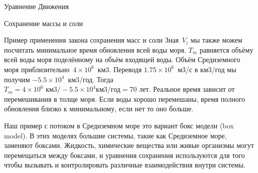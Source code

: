 \begin{chapter}{Уравнение Движения}
\begin{section}{Сохранение массы и соли}
\begin{paragraph}{Пример применения закона сохранения масс и соли}
Зная~$V_i$ мы также можем посчитать минимальное время обновления всей
воды моря. $T_m$ равняется объёму всей воды моря поделённому на объём
входящей воды. Объём Средиземного моря приблизительно~$4\times 10^6$~км3.  
Переводя $1.75\times 10^6$~м3/с в км3/год мы получим 
$-5.5 \times 10^4$~км3/год. Тогда 
$T_m = 4 \times 10^6\text{~км3}/-5.5 \times 10^4 \text{км3/год} = 70\text{ лет}$. 
Реальное время зависит от перемешивания в толще моря. Если воды хорошо
перемешаны, время полного обновления близко к минимальному, если нет
то оно больше.
%

Наш пример с потоком в Средиземном море это вариант бокс модели (box
model). В этих моделях большие системы, такие как Средиземное море,
заменяют боксами. Жидкость, химические вещества или живые организмы
могут перемещаться между боксами, и уравнения сохранения используются
для того чтобы вызывать и контролировать различные взаимодействия
внутри системы.
%
\end{paragraph}
\end{section}



\end{chapter}
